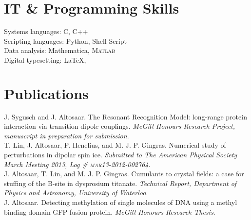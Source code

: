 \documentclass[12pt, letterpaper]{article}
\newcommand{\years}[1]{\marginnote{\normalsize #1}}
\begin{document}
\section*{IT \& Programming Skills}
Systems languages: C, C++\\
Scripting languages: Python, Shell Script\\
Data analysis: Mathematica, \textsc{Matlab}\\
Digital typesetting: \LaTeX, \XeTeX \\

\section*{Publications}
\years{2013}J. Sygusch and J. Altosaar. The Resonant Recognition Model: long-range protein interaction via transition dipole couplings. \emph{McGill Honours Research Project, manuscript in preparation for submission}.\\
\years{2013}T. Lin, J. Altosaar, P. Henelius, and M. J. P. Gingras. Numerical study of perturbations in dipolar spin ice. \emph{Submitted to The American Physical Society March Meeting 2013, Log \# \textsc{mar}13-2012-002764}.\\
\years{2012}J. Altosaar, T. Lin, and M. J. P. Gingras. Cumulants to crystal fields: a case for stuffing of the B-site in dysprosium titanate. \emph{Technical Report, Department of Physics and Astronomy, University of Waterloo}.\\
\years{2012}J. Altosaar. Detecting methylation of single molecules of DNA using a methyl binding domain GFP fusion protein. \emph{McGill Honours Research Thesis}.

\newpage
\end{document}

